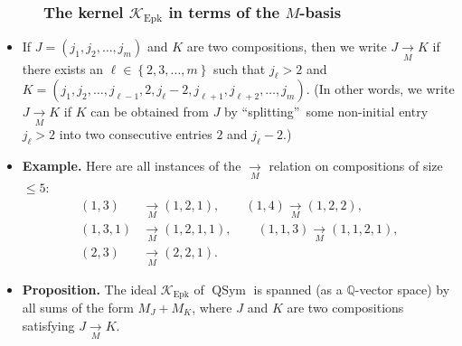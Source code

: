 \documentclass{beamer}
\newcommand{\Epk}{\operatorname{Epk}}
\newcommand{\calK}{\mathcal{K}}
\newcommand{\fti}[1]{\frametitle{\ \ \ \ \ #1}}
\newcommand{\defn}[1]{{\color{darkred}\emph{#1}}} %
\theoremstyle{plain}
\begin{document}
\begin{frame}
\fti{The kernel $\calK_{\Epk}$ in terms of the $M$-basis}

\begin{itemize}

\item If $J=\left(  j_{1},j_{2},\ldots,j_{m}\right)  $ and $K$
are two compositions, then we write \defn{$J\underset{M}{\rightarrow}K$} if
there exists an $\ell\in\left\{  2,3,\ldots,m\right\}  $ such that $j_{\ell
}>2$ and $K=\left(  j_{1},j_{2},\ldots,j_{\ell-1},2,j_{\ell}-2,j_{\ell
+1},j_{\ell+2},\ldots,j_{m}\right)  $. (In other words, we write
$J\underset{M}{\rightarrow}K$ if $K$ can be obtained from $J$ by
\textquotedblleft splitting\textquotedblright\ some non-initial entry
$j_{\ell}>2$ into
two consecutive entries $2$ and $j_{\ell}-2$.)

\item \textbf{Example.} Here are all instances of the $\underset{M}{\rightarrow}$ relation
on compositions of size $\leq 5$:
\begin{align*}
\left(  1,3\right)  &\underset{M}{\rightarrow}\left(  1,2,1\right)  ,\qquad
\left(  1,4\right)    \underset{M}{\rightarrow}\left(  1,2,2\right)  ,\\
\left(  1,3,1\right)   &  \underset{M}{\rightarrow}\left(  1,2,1,1\right)  ,\qquad
\left(  1,1,3\right)    \underset{M}{\rightarrow}\left(  1,1,2,1\right)  ,\\
\left(  2,3\right)   &  \underset{M}{\rightarrow}\left(  2,2,1\right)  .
\end{align*}

\item \textbf{Proposition.}
The ideal $\mathcal{K}_{\operatorname*{Epk}}$ of $\operatorname*{QSym}$ is
spanned (as a $\mathbb{Q}$-vector space) by all sums of the form $M_{J}+M_{K}%
$, where $J$ and $K$ are two compositions satisfying
$J\underset{M}{\rightarrow}K$.

\end{itemize}

\end{frame}
\end{document}
